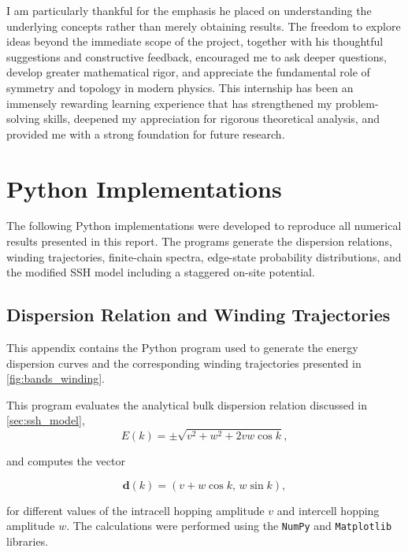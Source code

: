 \documentclass[11pt, a4paper]{article}
\begin{document}
I am particularly thankful for the emphasis he placed on understanding the underlying concepts rather than merely obtaining results. The freedom to explore ideas beyond the immediate scope of the project, together with his thoughtful suggestions and constructive feedback, encouraged me to ask deeper questions, develop greater mathematical rigor, and appreciate the fundamental role of symmetry and topology in modern physics. This internship has been an immensely rewarding learning experience that has strengthened my problem-solving skills, deepened my appreciation for rigorous theoretical analysis, and provided me with a strong foundation for future research.









\clearpage
\printbibliography
{}


\clearpage
\appendix
\section{Python Implementations}
The following Python implementations were developed to reproduce all numerical results presented in this report. The programs generate the dispersion relations, winding trajectories, finite-chain spectra, edge-state probability distributions, and the modified SSH model including a staggered on-site potential.

\subsection{Dispersion Relation and Winding Trajectories}

This appendix contains the Python program used to generate the energy dispersion curves and the corresponding winding trajectories presented in \cref{fig:bands_winding}.


This program evaluates the analytical bulk dispersion relation discussed in \cref{sec:ssh_model},
\begin{equation}
E(k)=\pm\sqrt{v^{2}+w^{2}+2vw\cos k},
\end{equation}

and computes the vector

\begin{equation}
\mathbf{d}(k)=
\left(
v+w\cos k,\,
w\sin k
\right),
\end{equation}

for different values of the intracell hopping amplitude \(v\) and intercell hopping amplitude \(w\).
The calculations were performed using the \texttt{NumPy} and \texttt{Matplotlib} libraries.
\end{document}
